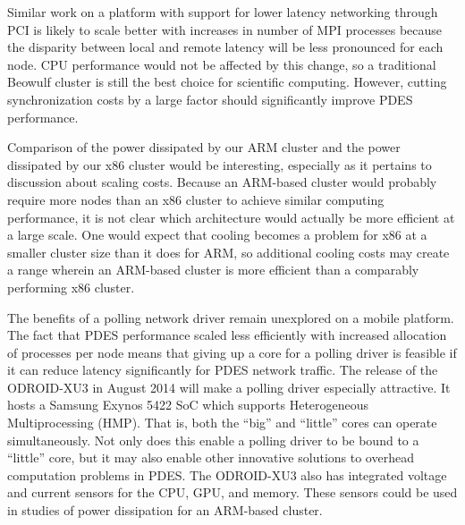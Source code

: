 \documentclass[11pt]{book}
\begin{document}
Similar work on a platform with support for lower latency networking through PCI is likely
to scale better with increases in number of MPI processes because the disparity between
local and remote latency will be less pronounced for each node.  CPU performance would not
be affected by this change, so a traditional Beowulf cluster is still the best choice for
scientific computing.  However, cutting synchronization costs by a large factor should
significantly improve PDES performance.

Comparison of the power dissipated by our ARM cluster and the power dissipated by our x86
cluster would be interesting, especially as it pertains to discussion about scaling costs.
Because an ARM-based cluster would probably require more nodes than an x86 cluster to
achieve similar computing performance, it is not clear which architecture would actually
be more efficient at a large scale. One would expect that cooling becomes a problem for
x86 at a smaller cluster size than it does for ARM, so additional cooling costs may create
a range wherein an ARM-based cluster is more efficient than a comparably performing x86
cluster.

The benefits of a polling network driver remain unexplored on a mobile platform. The fact
that PDES performance scaled less efficiently with increased allocation of processes per
node means that giving up a core for a polling driver is feasible if it can reduce latency
significantly for PDES network traffic. The release of the ODROID-XU3 \cite{xu3} in August
2014 will make a polling driver especially attractive. It hosts a Samsung Exynos 5422 SoC
which supports Heterogeneous Multiprocessing (HMP).  That is, both the ``big'' and
``little'' cores can operate simultaneously. Not only does this enable a polling driver to
be bound to a ``little'' core, but it may also enable other innovative solutions to
overhead computation problems in PDES. The ODROID-XU3 also has integrated voltage and
current sensors for the CPU, GPU, and memory. These sensors could be used in studies of
power dissipation for an ARM-based cluster.

\newpage
 

\end{document}
